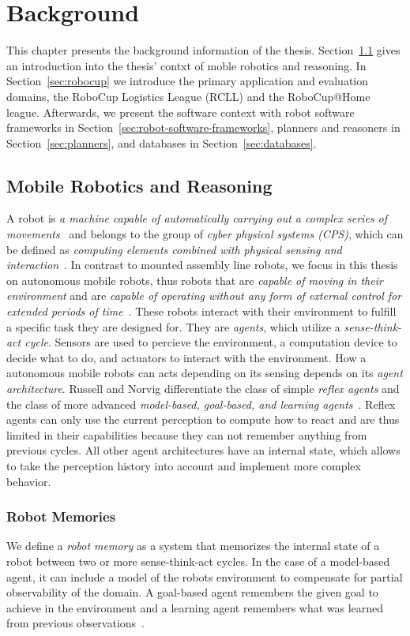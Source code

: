 \chapter{Background}
\label{chap:background}
This chapter presents the background information of the
thesis. Section~\ref{sec:mobile-robotics} gives an introduction into the
thesis' contxt of moble robotics and reasoning. In
Section~\ref{sec:robocup} we introduce the primary application and
evaluation domains, the RoboCup Logistics League (RCLL) and the
RoboCup@Home league. Afterwards, we present the software context with
robot software frameworks in
Section~\ref{sec:robot-software-frameworks}, planners and reasoners in
Section~\ref{sec:planners}, and databases in
Section~\ref{sec:databases}.

\section{Mobile Robotics and Reasoning}
\label{sec:mobile-robotics}
A robot is \emph{a machine capable of automatically carrying out a
  complex series of movements}~\cite{robot-dict} and belongs to the
group of \emph{cyber physical systems (CPS)}, which can be defined
as \emph{computing elements combined with physical sensing and
  interaction}~\cite{chapter-cps}. In contrast to mounted assembly
line robots, we focus in this thesis on autonomous mobile robots, thus
robots that are \emph{capable of moving in their environment} and
are \emph{capable of operating without any form of external control
  for extended periods of time}~\cite{autonomous-robots}. These robots
interact with their environment to fulfill a specific task they are
designed for. They are \emph{agents}, which utilize a
\emph{sense-think-act cycle}. Sensors are used to percieve the
environment, a computation device to decide what to do, and actuators
to interact with the environment. How a autonomous mobile robots can
acts depending on its sensing depends on its \emph{agent
  architecture}. Russell and Norvig differentiate the class of simple
\emph{reflex agents} and the class of more advanced
\emph{model-based, goal-based, and learning
  agents}~\cite{aimodern}. Reflex agents can only use the current
perception to compute how to react and are thus limited in their
capabilities because they can not remember anything from previous
cycles. All other agent architectures have an internal state, which
allows to take the perception history into account and implement more
complex behavior.

\subsection{Robot Memories}
\label{sec:robot-memories}
We define a \emph{robot memory} as a system that memorizes the
internal state of a robot between two or more sense-think-act
cycles. In the case of a model-based agent, it can include a model of
the robots environment to compensate for partial observability of the
domain. A goal-based agent remembers the given goal to achieve in the
environment and a learning agent remembers what was learned from
previous observations~\cite{aimodern}.

